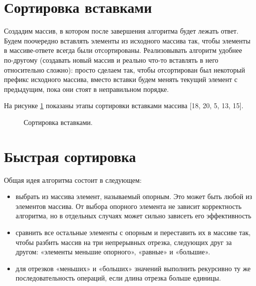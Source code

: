 \documentclass[12pt]{report}
\begin{document}
\section{Сортировка вставками}

Создадим массив, в котором после завершения алгоритма будет лежать ответ. Будем поочередно вставлять элементы из исходного массива так, чтобы элементы в массиве-ответе всегда были отсортированы. Реализовывать алгоритм удобнее по-другому (создавать новый массив и реально что-то вставлять в него относительно сложно): просто сделаем так, чтобы отсортирован был некоторый префикс исходного массива, вместо вставки будем менять текущий элемент с предыдущим, пока они стоят в неправильном порядке.

На рисунке \ref{fig:ins_s} показаны этапы сортировки вставками массива [18, 20, 5, 13, 15].

\begin{figure}[h]
	\caption{Сортировка вставками.}
	\label{fig:ins_s}
\end{figure}

\newpage

\section{Быстрая сортировка}
Общая идея алгоритма состоит в следующем:

\begin{itemize}
	\item выбрать из массива элемент, называемый опорным. Это может быть любой из элементов массива. От выбора опорного элемента не зависит корректность алгоритма, но в отдельных случаях может сильно зависеть его эффективность 
	\item сравнить все остальные элементы с опорным и переставить их в массиве так, чтобы разбить массив на три непрерывных отрезка, следующих друг за другом: «элементы меньшие опорного», «равные» и «большие».
	\item для отрезков «меньших» и «больших» значений выполнить рекурсивно ту же последовательность операций, если длина отрезка больше единицы.
\end{itemize}
\end{document}
